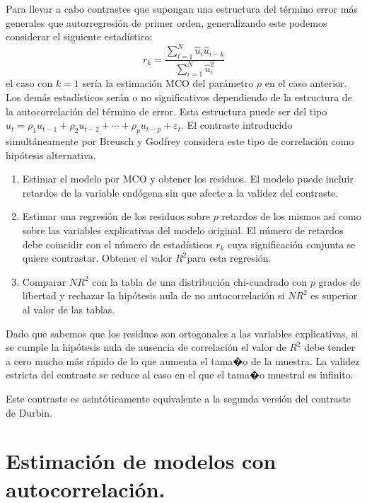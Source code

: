 Para llevar a cabo contrastes que supongan una estructura del t\'ermino
error m\'as generales que autorregresi\'on de primer orden, generalizando
este podemos considerar el siguiente estad\'istico: 
\[
r_{k}=\dfrac{\sum_{i=1}^{N}\hat{u}_{i}\hat{u}_{i-k}}{\sum_{i=1}^{N}\hat{u}_{i}^{2}}
\]
 el caso con $k=1$ ser\'ia la estimaci\'on MCO del par\'ametro $\rho$
en el caso anterior. Los dem\'as estad\'isticos ser\'an o no significativos
dependiendo de la estructura de la autocorrelaci\'on del t\'ermino de
error. Esta estructura puede ser del tipo $u_{t}=\rho_{1}u_{t-1}+\rho_{2}u_{t-2}+\cdots+\rho_{p}u_{t-p}+\varepsilon_{t}$.
El contraste introducido simult\'aneamente por Breusch y Godfrey considera
este tipo de correlaci\'on como hip\'otesis alternativa.
\begin{enumerate}
\item Estimar el modelo por MCO y obtener los residuos. El modelo puede
incluir retardos de la variable end\'ogena sin que afecte a la validez
del contraste.
\item Estimar una regresi\'on de los residuos sobre $p$ retardos de los mismos
as\'i como sobre las variables explicativas del modelo original. El
n\'umero de retardos debe coincidir con el n\'umero de estad\'isticos $r_{k}$
cuya significaci\'on conjunta se quiere contrastar. Obtener el valor
$R^{2}$para esta regresi\'on.
\item Comparar $NR^{2}$ con la tabla de una distribuci\'on chi-cuadrado con
$p$ grados de libertad y rechazar la hip\'otesis nula de no autocorrelaci\'on
si $NR^{2}$ es superior al valor de las tablas.
\end{enumerate}
Dado que sabemos que los residuos son ortogonales a las variables
explicativas, si se cumple la hip\'otesis nula de ausencia de correlaci\'on
el valor de $R^{2}$ debe tender a cero mucho m\'as r\'apido de lo que
aumenta el tama�o de la muestra. La validez estricta del contraste
se reduce al caso en el que el tama�o muestral es infinito.

Este contraste es asint\'oticamente equivalente a la segunda versi\'on
del contraste de Durbin.


\section{Estimaci\'on de modelos con autocorrelaci\'on.}

